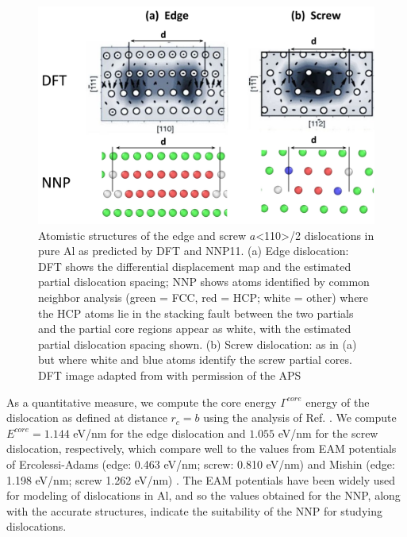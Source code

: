 \documentclass{article}
\begin{document}
\begin{figure}[H]%
\centering%
\includegraphics[width=1\textwidth,center]{figures/dislocation_NNPvsDFT.png}%
\caption{Atomistic structures of the edge and screw $a$<110>/2 dislocations in pure Al as predicted by DFT and NNP11. (a) Edge dislocation: DFT shows the differential displacement map and the estimated partial dislocation spacing; NNP shows atoms identified by common neighbor analysis (green = FCC, red = HCP; white = other) where the HCP atoms lie in the stacking fault between the two partials and the partial core regions appear as white, with the estimated partial dislocation spacing shown. (b) Screw dislocation: as in (a) but where white and blue atoms identify the screw partial cores.
DFT image adapted from \cite{Woodward2008PredictionTheory} with permission of the APS
}%
\label{fig:dislocation_NNPvsDFT}
\end{figure}

As a quantitative measure, we compute the core energy $\Gamma^{core}$ energy of the dislocation as defined at distance $r_c = b$ using the analysis of Ref. \cite{Hu2020AtomisticDynamics}.
We compute $E^{core}=1.144$ eV/nm for the edge dislocation and $1.055$ eV/nm for the screw dislocation, respectively, which compare well to the values from EAM potentials of Ercolessi-Adams\cite{Ercolesi1994InteratomicMethod} (edge: 0.463 eV/nm; screw: 0.810 eV/nm) and Mishin\cite{Mishin1999InteratomicCalculations} (edge: 1.198 eV/nm; screw 1.262 eV/nm) \cite{Hu2020AtomisticDynamics}.  The EAM potentials have been widely used for modeling of dislocations in Al, and so the values obtained for the NNP, along with the accurate structures, indicate the suitability of the NNP for studying dislocations.
\end{document}
